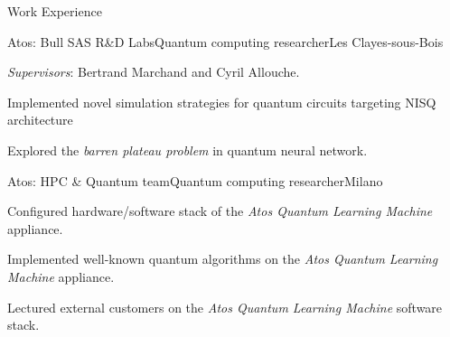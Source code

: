\documentclass[
	a4paper, %
	11pt, %
]{resume} %
\begin{document}
%
\begin{rSection}{Work Experience}
  \begin{rSubsection}{Atos: Bull SAS R\&D Labs}{\origdate{}}{Quantum computing researcher}{Les Clayes-sous-Bois}
  \item \emph{Supervisors}: Bertrand Marchand and Cyril Allouche.
  \item Implemented novel simulation strategies for quantum circuits targeting
    NISQ architecture
  \item Explored the \emph{barren plateau problem} in quantum neural network.
  \end{rSubsection}

  \begin{rSubsection}{Atos: HPC \& Quantum team}{\origdate{}}{Quantum computing researcher}{Milano}
  \item Configured hardware/software stack of the \textit{Atos Quantum Learning Machine} appliance.
  \item Implemented well-known quantum algorithms on the \textit{Atos Quantum
      Learning Machine} appliance.
\item Lectured external customers on the \textit{Atos Quantum Learning Machine} software stack.
\end{rSubsection}

\end{rSection}
\end{document}
